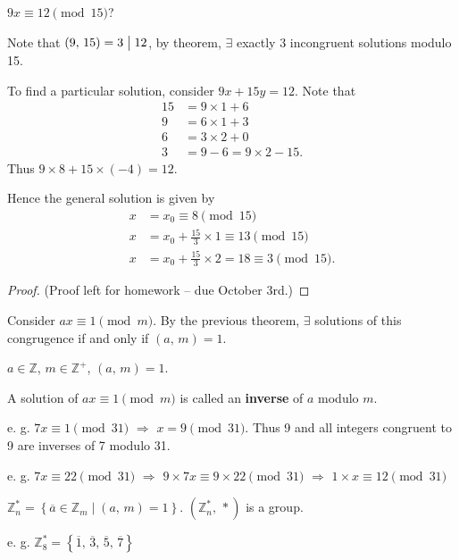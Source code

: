 \begin{example}
    $9x \equiv 12\pmod{15}$?

    Note that $\left(9,\,15\right)=3\bigm| 12$, by theorem,
    $\exists$ exactly 3 incongruent solutions modulo 15.

    To find a particular solution, consider $9x+15y=12$.
    Note that
    \begin{align*}
        15&=9 \times 1 + 6 \\
        9&=6 \times 1 + 3 \\
        6&=3 \times 2 + 0 \\
        3&=9-6=9\times 2 - 15.
    \end{align*}
    Thus $9 \times 8 + 15 \times \left(-4\right) = 12$.

    Hence the general solution is given by
    \begin{align*}
        x&=x_0\equiv8 \pmod{15} \\ 
        x&=x_0+\frac{15}{3}\times 1\equiv13 \pmod{15} \\ 
        x&=x_0+\frac{15}{3}\times 2=18\equiv 3 \pmod{15}.
    \end{align*}
\end{example}

\begin{proof}
    (Proof left for homework -- due October 3rd.)
\end{proof}

\begin{remark}
    Consider $ax \equiv 1\pmod{m}$.
    By the previous theorem, $\exists$ solutions of this congrugence
    if and only if $\left(a,\,m\right) = 1$.
\end{remark}

\begin{definition}
    $a \in \mathbb{Z}$, $m \in \mathbb{Z}^+$, $\left(a,\,m\right)=1$.

    A solution of $ax \equiv 1\pmod{m}$ is called an \textbf{inverse} of
    $a$ modulo $m$.
\end{definition}

e. g. $7x\equiv 1\pmod{31}$ $\Rightarrow$ $x=9\pmod{31}$.
Thus 9 and all integers congruent to 9 are inverses of 7 modulo 31.

e. g. $7x \equiv 22\pmod{31}$ $\Rightarrow$ $9\times 7x \equiv 9\times 22\pmod{31}$
$\Rightarrow$ $1\times x \equiv 12\pmod{31}$

\begin{remark}
    $\mathbb{Z}_n^*=\left\{\overline{a}\in \mathbb{Z}_m \mid \left(a,\,m\right)=1\right\}$.
    $\left(\mathbb{Z}_n^*,\,*\right)$ is a group.
\end{remark}

e. g. $\mathbb{Z}_{8}^*=\left\{\overline{1},\,\overline{3},\,\overline{5},\,\overline{7}\right\}$